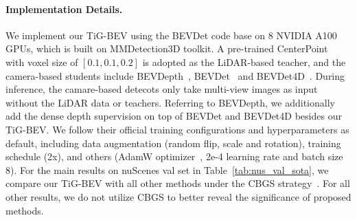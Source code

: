 \paragraph{Implementation Details.}
We implement our TiG-BEV using the BEVDet\cite{b19,b23} code base on 8 NVIDIA A100 GPUs, which is built on MMDetection3D toolkit\cite{b55}. A pre-trained CenterPoint~\cite{b53} with voxel size of $[0.1,0.1,0.2]$ is adopted as the LiDAR-based teacher, and the camera-based students include BEVDepth~\cite{b7}, BEVDet~\cite{b19} and BEVDet4D~\cite{b23}. During inference, the camare-based detecots only take multi-view images as input without the LiDAR data or teachers.
Referring to BEVDepth, we additionally add the dense depth supervision on top of BEVDet and BEVDet4D besides our TiG-BEV. We follow their official training configurations and hyperparameters as default, including data augmentation (random flip, scale and rotation), training schedule (2x), and others (AdamW optimizer~\cite{b16}, 2e-4 learning rate and batch size 8). For the main results on nuScenes val set in Table~\ref{tab:nus_val_sota}, we compare our TiG-BEV with all other methods under the CBGS strategy~\cite{b56}. For all other results, we do not utilize CBGS to better reveal the significance of proposed methods.


%











